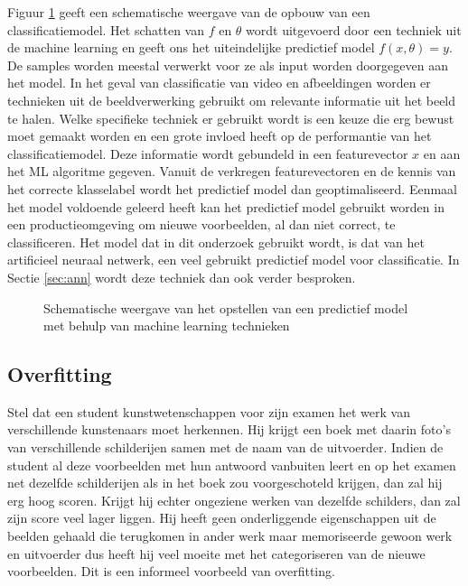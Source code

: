 \npar Figuur \ref{fig:alg-class-model} geeft een schematische weergave van de opbouw van een classificatiemodel. Het schatten van $f$ en $\theta$ wordt uitgevoerd door een techniek uit de machine learning en geeft ons het uiteindelijke predictief model $f(x,\theta) = y$. De samples worden meestal verwerkt voor ze als input worden doorgegeven aan het model. In het geval van classificatie van video en afbeeldingen worden er technieken uit de beeldverwerking gebruikt om relevante informatie uit het beeld te halen. Welke specifieke techniek er gebruikt wordt is een keuze die erg bewust moet gemaakt worden en een grote invloed heeft op de performantie van het classificatiemodel. Deze informatie wordt gebundeld in een featurevector $x$ en aan het ML algoritme gegeven. Vanuit de verkregen featurevectoren en de kennis van het correcte klasselabel wordt het predictief model dan geoptimaliseerd.
\npar Eenmaal het model voldoende geleerd heeft kan het predictief model gebruikt worden in een productieomgeving om nieuwe voorbeelden, al dan niet correct, te classificeren.
\npar Het model dat in dit onderzoek gebruikt wordt, is dat van het artificieel neuraal netwerk, een veel gebruikt predictief model voor classificatie. In Sectie \ref{sec:ann} wordt deze techniek dan ook verder besproken.
\begin{figure}[t]
	\centering
	\def\svgscale{0.85}
	
	\caption{Schematische weergave van het opstellen van een predictief model met behulp van machine learning technieken \label{fig:alg-class-model}}
\end{figure}

\subsection{Overfitting}
Stel dat een student kunstwetenschappen voor zijn examen het werk van verschillende kunstenaars moet herkennen. Hij krijgt een boek met daarin foto's van verschillende schilderijen samen met de naam van de uitvoerder. Indien de student al deze voorbeelden met hun antwoord vanbuiten leert en op het examen net dezelfde schilderijen als in het boek zou voorgeschoteld krijgen, dan zal hij erg hoog scoren. Krijgt hij echter ongeziene werken van dezelfde schilders, dan zal zijn score veel lager liggen. Hij heeft geen onderliggende eigenschappen uit de beelden gehaald die terugkomen in ander werk maar memoriseerde gewoon werk en uitvoerder dus heeft hij veel moeite met het categoriseren van de nieuwe voorbeelden. Dit is een informeel voorbeeld van overfitting.

